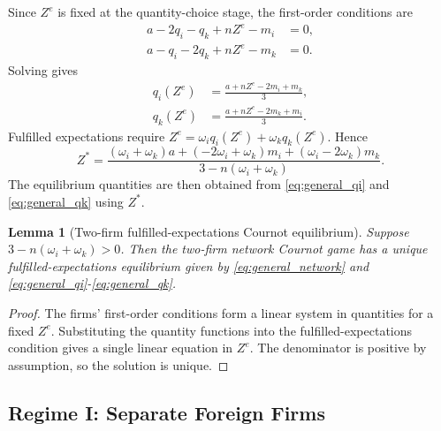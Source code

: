 \documentclass[12pt]{article}
\newtheorem{lemma}{Lemma}
\begin{document}
Since $Z^e$ is fixed at the quantity-choice stage, the first-order conditions are
\begin{align}
a-2q_i-q_k+nZ^e-m_i&=0,\label{eq:general_foc_i}\\
a-q_i-2q_k+nZ^e-m_k&=0.\label{eq:general_foc_k}
\end{align}
Solving gives
\begin{align}
q_i(Z^e)&=\frac{a+nZ^e-2m_i+m_k}{3},\label{eq:general_qi}\\
q_k(Z^e)&=\frac{a+nZ^e-2m_k+m_i}{3}.\label{eq:general_qk}
\end{align}
Fulfilled expectations require $Z^e=\omega_iq_i(Z^e)+\omega_kq_k(Z^e)$. Hence
\begin{equation}
Z^*=\frac{(\omega_i+\omega_k)a+(-2\omega_i+\omega_k)m_i+(\omega_i-2\omega_k)m_k}{3-n(\omega_i+\omega_k)}.
\label{eq:general_network}
\end{equation}
The equilibrium quantities are then obtained from \eqref{eq:general_qi} and \eqref{eq:general_qk} using $Z^*$.

\begin{lemma}[Two-firm fulfilled-expectations Cournot equilibrium]
Suppose $3-n(\omega_i+\omega_k)>0$. Then the two-firm network Cournot game has a unique fulfilled-expectations equilibrium given by \eqref{eq:general_network} and \eqref{eq:general_qi}-\eqref{eq:general_qk}.
\end{lemma}

\begin{proof}
The firms' first-order conditions form a linear system in quantities for a fixed $Z^e$. Substituting the quantity functions into the fulfilled-expectations condition gives a single linear equation in $Z^e$. The denominator is positive by assumption, so the solution is unique.
\end{proof}

\subsection{Regime I: Separate Foreign Firms}
\end{document}
